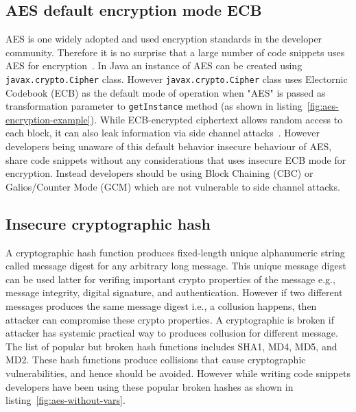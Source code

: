 
\subsection{AES default encryption mode ECB }
AES is one widely adopted and used encryption standards in the developer community. Therefore it is no surprise that a 
large number of code snippets uses AES for encryption~\cite{aes-encryption}. 
In Java an instance of AES can be created using \texttt{javax.crypto.\-Cipher} class. 
However \texttt{javax.crypto.Cipher} class uses Electornic Codebook (ECB) as the 
default mode of operation when  "AES" is passed as transformation parameter to \texttt{getInstance} method (as shown in listing~\ref{fig:aes-encryption-example}). 
While ECB-encrypted ciphertext allows random access to each block, it can also leak information via side channel attacks~\cite{egele2013empirical}. 
However developers being unaware of this default behavior insecure behaviour of AES, share code snippets without 
any considerations that uses insecure ECB mode for encryption. 
Instead developers should be using Block Chaining (CBC) or Galios/Counter Mode (GCM) which are not vulnerable to side channel attacks. %
  
\subsection{Insecure cryptographic hash}
A cryptographic hash function produces fixed-length unique alphanumeric string called message digest for any arbitrary long message. 
This unique message digest can be used latter for verifing important crypto properties of the message e.g., message integrity, digital signature, 
and authentication. 
However if two different messages produces the same message digest i.e., a collusion happens, 
then attacker can compromise these crypto properties. A cryptographic is broken if attacker has systemic practical way to produces collusion for 
different message. The list of popular but broken hash functions includes SHA1, MD4, MD5, and MD2. These hash functions produce collisions that 
cause cryptographic vulnerabilities, and hence should be avoided. However while writing code snippets developers have been using these popular 
broken hashes as shown in listing~\ref{fig:aes-without-vars}. 


